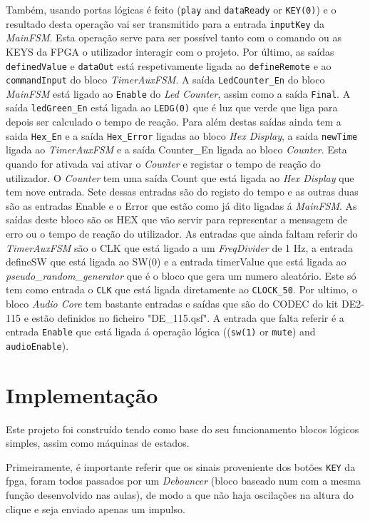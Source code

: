 \documentclass[a4paper,11pt,onecolumn]{report}
\begin{document}
Também, usando portas lógicas é feito (\texttt{play} and \texttt{dataReady} or \texttt{KEY(0)}) e o resultado desta operação vai ser transmitido para a entrada \texttt{inputKey} da \textit{MainFSM}. Esta operação serve para ser possível tanto com o comando ou  as KEYS da FPGA o utilizador interagir com o projeto. Por último, as saídas \texttt{definedValue} e \texttt{dataOut} está respetivamente ligada ao \texttt{defineRemote} e ao \texttt{commandInput} do bloco \textit{TimerAuxFSM}.  A saída \texttt{LedCounter\_En} do bloco \textit{MainFSM} está ligado ao \texttt{Enable} do \textit{Led Counter}, assim como a saída \texttt{Final}. A saída \texttt{ledGreen\_En} está ligada ao \texttt{LEDG(0)} que é luz que verde que liga para depois ser calculado o tempo de reação. Para além destas saídas ainda tem a saida \texttt{Hex\_En} e a saída \texttt{Hex\_Error} ligadas ao bloco \textit{Hex Display}, a saida \texttt{newTime} ligada ao \textit{TimerAuxFSM} e a saída Counter\_En ligada ao bloco \textit{Counter}. Esta quando for ativada vai ativar o \textit{Counter} e registar o tempo de reação do utilizador. O \textit{Counter} tem uma saída Count que está ligada ao \textit{Hex Display} que tem nove entrada. Sete dessas entradas são do registo do tempo e as outras duas são as entradas Enable e o Error que estão como já dito ligadas á \textit{MainFSM}. As saídas deste bloco são os HEX que vão servir para representar a mensagem de erro ou o tempo de reação do utilizador. As entradas que ainda faltam referir do \textit{TimerAuxFSM} são o CLK que está ligado a um \textit{FreqDivider} de 1 Hz, a entrada defineSW que está ligada ao SW(0) e a entrada timerValue que está ligada ao \textit{pseudo\_random\_generator} que é o bloco que gera um numero aleatório. Este só tem como entrada o \texttt{CLK} que está ligada diretamente ao \texttt{CLOCK\_50}. Por ultimo, o bloco \textit{Audio Core} tem bastante entradas e saídas que são do CODEC do kit DE2-115 e estão definidos no ficheiro "DE\_115.qsf". A entrada que falta referir é a entrada \texttt{Enable} que está ligada á operação lógica ((\texttt{sw(1)} or \texttt{mute}) and \texttt{audioEnable}).

\section{Implementação}

Este projeto foi construído tendo como base do seu funcionamento blocos lógicos simples, assim como máquinas de estados.

Primeiramente, é importante referir que os sinais proveniente dos botões \texttt{KEY} da \ac{fpga}, foram todos passados por um \textit{Debouncer} (bloco baseado num com a mesma função desenvolvido nas aulas), de modo a que não haja oscilações na altura do clique e seja enviado apenas um impulso.
\end{document}
